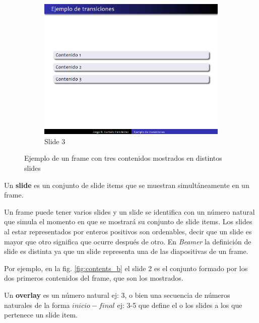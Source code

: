\begin{figure}[tb]
\begin{subfigure}[b]{0.3\textwidth}
 				\includegraphics[width=\textwidth]{img/content3}
 				\caption{Slide 3}
 				\label{fig:contents_c}	
 			\end{subfigure}	 			
 			\caption{Ejemplo de un frame con tres contenidos mostrados en distintos slides}
 			\label{fig:contents} 
 		\end{figure}

 		\begin{definition}
 		\label{def:slide}
 			Un \textbf{slide} es un conjunto de slide items que se muestran simultáneamente en un frame.
 		\end{definition}
		
		Un frame puede tener varios slides y un slide se identifica con un número natural que simula el momento en que se mostrará su conjunto de slide items. Los slides al estar representados por enteros positivos son ordenables, decir que un slide es mayor que otro significa que ocurre después de otro. En \textit{Beamer} la definición de slide es distinta ya que un slide representa una de las diapositivas de un frame.

		Por ejemplo, en la fig. \ref{fig:contents_b} el slide 2 es el conjunto formado por los dos primeros contenidos del frame, que son los mostrados. 				

 		\begin{definition}
 		\label{def:overlay}
 			Un \textbf{overlay} es un número natural ej: 3, o bien una secuencia de números naturales de la forma \( inicio-final \) ej: 3-5 que define el o los slides a los que pertenece un slide item.
 		\end{definition}

